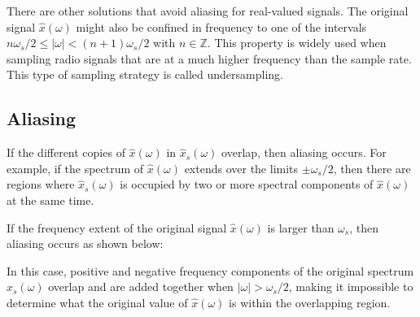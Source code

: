 There are other solutions that avoid aliasing for real-valued signals. The original signal $\hat{x}(\omega)$ might also be confined in frequency to one of the intervals $n \omega_s/2 \le |\omega| < (n+1)\omega_s/2$ with $n\in\mathbb{Z}$. 
This property is widely used when sampling radio signals that are at a much higher frequency than the sample rate. This type of sampling strategy is called undersampling.

\subsection{Aliasing}
If the different copies of $\hat{x}(\omega)$ in $\hat{x}_s(\omega)$ overlap, then aliasing occurs. For example, if the spectrum of $\hat{x}(\omega)$ extends over the limits $\pm \omega_s/2$, 
then there are regions where $\hat{x}_s(\omega)$ is occupied by two or more spectral components of $\hat{x}(\omega)$ at the same time.

If the frequency extent of the original signal $\hat{x}(\omega)$ is larger than $\omega_s$, then aliasing occurs as shown below:
\begin{center}
\end{center}
In this case, positive and negative frequency components of the original spectrum $\hat{x}_s(\omega)$ overlap and are added together when $|\omega| > \omega_s/2$, 
making it impossible to determine what the original value of $\hat{x}(\omega)$ is within the overlapping region.

